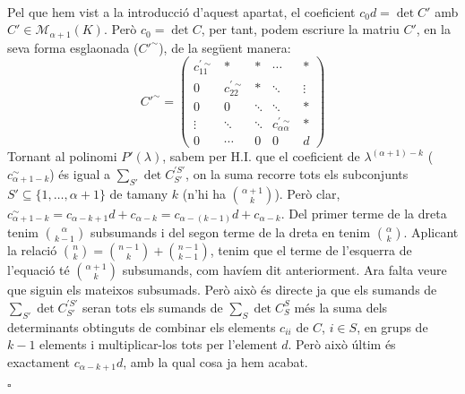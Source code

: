 \documentclass[11pt,a4paper]{article}
\newcommand*{\QED}{\hfill\ensuremath{\square}}
\begin{document}
\begin{enumerate}
\begin{multline*}
   \end{multline*}
   Pel que hem vist a la introducció d'aquest apartat, el coeficient $c_0d=\det C'$ amb $C'\in \mathcal{M}_{\alpha+1}(K)$. Però $c_0=\det C$, per tant, podem escriure la matriu $C'$, en la seva forma esglaonada ($C'^\sim$), de la següent manera:
   $$C'^\sim=\begin{pmatrix}
      c_{11}^{'\sim} & \ast & \ast & \cdots & \ast\\
      0 & c_{22}^{'\sim} & \ast & \ddots & \vdots\\
      0 & 0 & \ddots & \ddots & \ast\\
      \vdots & \ddots & \ddots & c_{\alpha\alpha}^{'\sim} & \ast \\
      0 & \cdots & 0 & 0 & d
   \end{pmatrix}$$
   Tornant al polinomi $P'(\lambda)$, sabem per H.I. que el coeficient de $\lambda^{(\alpha+1)-k}$ ($c_{\alpha+1-k}^\sim$) és igual a $\sum_{S'} \det C_{S'}^{'S'}$, on la suma recorre tots els subconjunts $S'\subseteq \{1,\ldots,\alpha+1\}$ de tamany $k$ (n'hi ha $\binom{\alpha+1}{k}$). Però clar, $c_{\alpha+1-k}^\sim=c_{\alpha-k+1}d+c_{\alpha-k}=c_{\alpha-(k-1)}d+c_{\alpha-k}$. Del primer terme de la dreta tenim $\binom{\alpha}{k-1}$ subsumands i del segon terme de la dreta en tenim $\binom{\alpha}{k}$. Aplicant la relació $\binom{n}{k}=\binom{n-1}{k}+\binom{n-1}{k-1}$, tenim que el terme de l'esquerra de l'equació té $\binom{\alpha+1}{k}$ subsumands, com havíem dit anteriorment. Ara falta veure que siguin els mateixos subsumads. Però això és directe ja que els sumands de $\sum_{S'} \det C_{S'}^{'S'}$ seran tots els sumands de $\sum_S \det C_S^{S}$ més la suma dels determinants obtinguts de combinar els elements $c_{ii}$ de $C$, $i\in S$, en grups de $k-1$ elements i multiplicar-los tots per l'element $d$. Però això últim és exactament $c_{\alpha-k+1}d$, amb la qual cosa ja hem acabat.\par\QED
   
   
   

\end{enumerate}
\end{document}
